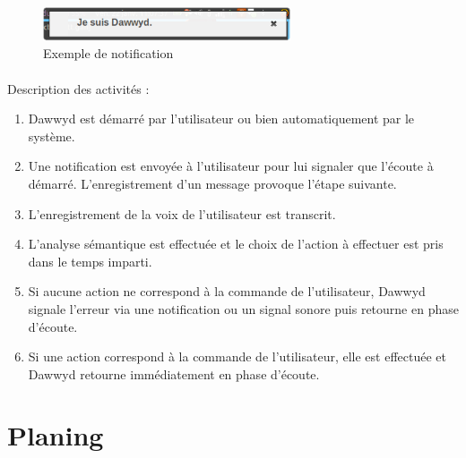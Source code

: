 \documentclass[12pt]{article}
\begin{document}
    \begin{figure}
        \centering
        \includegraphics[height=1cm]{exemple_notif.png}
        \caption{Exemple de notification}
    \end{figure}

    \paragraph{}
    Description des activités :
    \begin{enumerate}
        \item Dawwyd est démarré par l'utilisateur ou bien automatiquement par
            le système.
        \item Une notification est envoyée à l'utilisateur pour lui signaler
            que l'écoute à démarré. L'enregistrement d'un message provoque
            l'étape suivante.
        \item L'enregistrement de la voix de l'utilisateur est transcrit.
        \item L'analyse sémantique est effectuée et le choix de l'action à effectuer
            est pris dans le temps imparti.
        \item Si aucune action ne correspond à la commande de l'utilisateur,
            Dawwyd signale l'erreur via une notification ou un signal sonore
            puis retourne en phase d'écoute.
        \item Si une action correspond à la commande de l'utilisateur, elle est
            effectuée et Dawwyd retourne immédiatement en phase d'écoute.
    \end{enumerate}



    \section{Planing}
\end{document}
